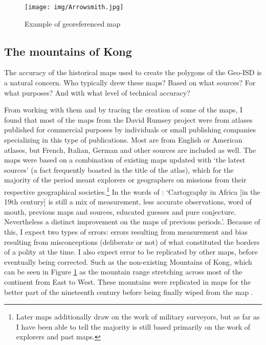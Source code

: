 \documentclass[12pt]{article}
\begin{document}

\begin{figure}[h!tpb]
	\centering
	\texttt{[image: img/Arrowsmith.jpg]}
	\caption{Example of georeferenced map}%
	\label{Arrowsmith}
\end{figure}


\subsection{The mountains of Kong}

The accuracy of the historical maps used to create the polygons of the Geo-ISD
is a natural concern. Who typically drew these maps? Based on what sources? For
what purposes? And with what level of technical accuracy? 

From working with them and by tracing the creation of some of the maps, I found
that most of the maps from the David Rumsey project were from atlases published
for commercial purposes by individuals or small publishing companies
specializing in this type of publications. Most are from English or American
atlases, but French, Italian, German and other sources are included as well. The
maps were based on a combination of existing maps updated with `the latest
sources' (a fact frequently boasted in the title of the atlas), which for the
majority of the period meant explorers or geographers on missions from their
respective geographical societies.\footnote{Later maps additionally draw on the
	work of military surveyors, but as far as I have been able to tell the
majority is still based primarily on the work of explorers and past maps.} In
the words of \citet[47-48]{Stone1995}: `Cartography in Africa [in the 19th
century] is still a mix of measurement, less accurate observations, word of
mouth, previous maps and sources, educated guesses and pure conjecture.
Nevertheless a distinct improvement on the maps of previous periods.'. Because
of this, I expect two types of errors: errors resulting from measurement and
bias resulting from misconceptions (deliberate or not) of what constituted the
borders of a polity at the time. I also expect error to be replicated by other
maps, before eventually being corrected. Such as the non-existing Mountains of
Kong, which can be seen in Figure \ref{Arrowsmith} as the mountain range
stretching across most of the continent from East to West. These mountains were
replicated in maps for the better part of the nineteenth century before being
finally wiped from the map \citep{Bassett_1991}.
\end{document}
